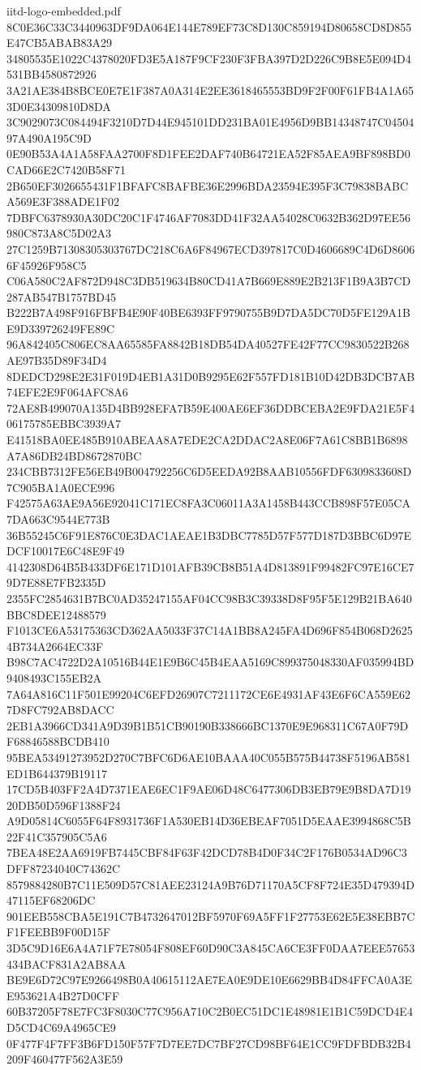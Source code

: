 \begin{filecontents*}[overwrite]{iitd-logo-embedded.pdf}
8C0E36C33C3440963DF9DA064E144E789EF73C8D130C859194D80658CD8D855E47CB5ABAB83A29
34805535E1022C4378020FD3E5A187F9CF230F3FBA397D2D226C9B8E5E094D4531BB4580872926
3A21AE384B8BCE0E7E1F387A0A314E2EE3618465553BD9F2F00F61FB4A1A653D0E34309810D8DA
3C9029073C084494F3210D7D44E945101DD231BA01E4956D9BB14348747C0450497A490A195C9D
0E90B53A4A1A58FAA2700F8D1FEE2DAF740B64721EA52F85AEA9BF898BD0CAD66E2C7420B58F71
2B650EF3026655431F1BFAFC8BAFBE36E2996BDA23594E395F3C79838BABCA569E3F388ADE1F02
7DBFC6378930A30DC20C1F4746AF7083DD41F32AA54028C0632B362D97EE56980C873A8C5D02A3
27C1259B71308305303767DC218C6A6F84967ECD397817C0D4606689C4D6D86066F45926F958C5
C06A580C2AF872D948C3DB519634B80CD41A7B669E889E2B213F1B9A3B7CD287AB547B1757BD45
B222B7A498F916FBFB4E90F40BE6393FF9790755B9D7DA5DC70D5FE129A1BE9D339726249FE89C
96A842405C806EC8AA65585FA8842B18DB54DA40527FE42F77CC9830522B268AE97B35D89F34D4
8DEDCD298E2E31F019D4EB1A31D0B9295E62F557FD181B10D42DB3DCB7AB74EFE2E9F064AFC8A6
72AE8B499070A135D4BB928EFA7B59E400AE6EF36DDBCEBA2E9FDA21E5F406175785EBBC3939A7
E41518BA0EE485B910ABEAA8A7EDE2CA2DDAC2A8E06F7A61C8BB1B6898A7A86DB24BD8672870BC
234CBB7312FE56EB49B004792256C6D5EEDA92B8AAB10556FDF6309833608D7C905BA1A0ECE996
F42575A63AE9A56E92041C171EC8FA3C06011A3A1458B443CCB898F57E05CA7DA663C9544E773B
36B55245C6F91E876C0E3DAC1AEAE1B3DBC7785D57F577D187D3BBC6D97EDCF10017E6C48E9F49
4142308D64B5B433DF6E171D101AFB39CB8B51A4D813891F99482FC97E16CE79D7E88E7FB2335D
2355FC2854631B7BC0AD35247155AF04CC98B3C39338D8F95F5E129B21BA640BBC8DEE12488579
F1013CE6A53175363CD362AA5033F37C14A1BB8A245FA4D696F854B068D26254B734A2664EC33F
B98C7AC4722D2A10516B44E1E9B6C45B4EAA5169C899375048330AF035994BD9408493C155EB2A
7A64A816C11F501E99204C6EFD26907C7211172CE6E4931AF43E6F6CA559E627D8FC792AB8DACC
2EB1A3966CD341A9D39B1B51CB90190B338666BC1370E9E968311C67A0F79DF68846588BCDB410
95BEA53491273952D270C7BFC6D6AE10BAAA40C055B575B44738F5196AB581ED1B644379B19117
17CD5B403FF2A4D7371EAE6EC1F9AE06D48C6477306DB3EB79E9B8DA7D1920DB50D596F1388F24
A9D05814C6055F64F8931736F1A530EB14D36EBEAF7051D5EAAE3994868C5B22F41C357905C5A6
7BEA48E2AA6919FB7445CBF84F63F42DCD78B4D0F34C2F176B0534AD96C3DFF87234040C74362C
8579884280B7C11E509D57C81AEE23124A9B76D71170A5CF8F724E35D479394D47115EF68206DC
901EEB558CBA5E191C7B4732647012BF5970F69A5FF1F27753E62E5E38EBB7CF1FEEBB9F00D15F
3D5C9D16E6A4A71F7E78054F808EF60D90C3A845CA6CE3FF0DAA7EEE57653434BACF831A2AB8AA
BE9E6D72C97E9266498B0A40615112AE7EA0E9DE10E6629BB4D84FFCA0A3EE953621A4B27D0CFF
60B37205F78E7FC3F8030C77C956A710C2B0EC51DC1E48981E1B1C59DCD4E4D5CD4C69A4965CE9
0F477F4F7FF3B6FD150F57F7D7EE7DC7BF27CD98BF64E1CC9FDFBDB32B4209F460477F562A3E59

\end{filecontents*}
